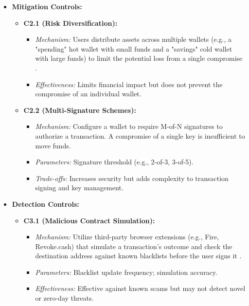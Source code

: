 \begin{itemize}
    \item \textbf{Mitigation Controls:}
    \begin{itemize}
        \item \textbf{C2.1 (Risk Diversification):}
            \begin{itemize}
                \item \textit{Mechanism:} Users distribute assets across multiple wallets (e.g., a "spending" hot wallet with small funds and a "savings" cold wallet with large funds) to limit the potential loss from a single compromise \cite{yu2024}.
                \item \textit{Effectiveness:} Limits financial impact but does not prevent the compromise of an individual wallet.
            \end{itemize}
        \item \textbf{C2.2 (Multi-Signature Schemes):}
            \begin{itemize}
                \item \textit{Mechanism:} Configure a wallet to require M-of-N signatures to authorize a transaction. A compromise of a single key is insufficient to move funds.
                \item \textit{Parameters:} Signature threshold (e.g., 2-of-3, 3-of-5).
                \item \textit{Trade-offs:} Increases security but adds complexity to transaction signing and key management.
            \end{itemize}
    \end{itemize}

    \item \textbf{Detection Controls:}
    \begin{itemize}
        \item \textbf{C3.1 (Malicious Contract Simulation):}
            \begin{itemize}
                \item \textit{Mechanism:} Utilize third-party browser extensions (e.g., Fire, Revoke.cash) that simulate a transaction's outcome and check the destination address against known blacklists before the user signs it \cite{yu2024}.
                \item \textit{Parameters:} Blacklist update frequency; simulation accuracy.
                \item \textit{Effectiveness:} Effective against known scams but may not detect novel or zero-day threats.
            \end{itemize}
    \end{itemize}
\end{itemize}

